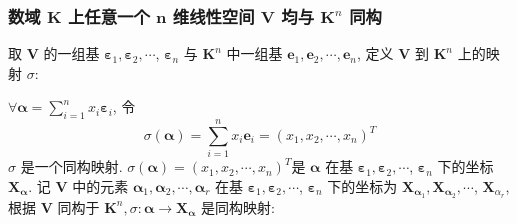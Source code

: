 \documentclass{article}
\begin{document}
			\subsubsection{数域 $\mathbf K$ 上任意一个 $\boldsymbol n$ 维线性空间 $\boldsymbol V$ 均与 $\mathbf K^{n}$ 同构}
				取 $\boldsymbol V$ 的一组基 $\boldsymbol \varepsilon_{1}, \boldsymbol \varepsilon_{2}, \cdots$, $\boldsymbol \varepsilon_{n}$ 与 $\mathbf K^{n}$ 中一组基 $\boldsymbol{e}_{1}, \boldsymbol{e}_{2}, \cdots, \boldsymbol{e}_{n}$, 定义 $\boldsymbol V$ 到 $\mathbf K^{n}$ 上的映射 $\sigma$:

				$\forall\boldsymbol\alpha=\sum_{i=1}^{n} x_{i} \boldsymbol \varepsilon_{i}$, 令
				$$
				\sigma(\boldsymbol{\alpha})=\sum_{i=1}^{n} x_{i} \boldsymbol{e}_{i}=\left(x_{1}, x_{2}, \cdots, x_{n}\right)^{T}
				$$
				$\sigma$ 是一个同构映射. $\sigma(\boldsymbol{\alpha})=\left(x_{1}, x_{2}, \cdots, x_{n}\right)^{T}$是 $\boldsymbol{\alpha}$ 在基 $\boldsymbol \varepsilon_{1}, \boldsymbol \varepsilon_{2}, \cdots$, $\boldsymbol \varepsilon_{n}$ 下的坐标 $\boldsymbol{X}_{\boldsymbol{\alpha}}$.
				记 $\boldsymbol V$ 中的元素 $\boldsymbol{\alpha}_{1}, \boldsymbol{\alpha}_{2}, \cdots, \boldsymbol{\alpha}_{r}$ 在基 $\boldsymbol \varepsilon_{1}, \boldsymbol \varepsilon_{2}, \cdots$, $\boldsymbol \varepsilon_{n}$ 下的坐标为 $\boldsymbol{X}_{\boldsymbol{\alpha}_{1}}, \boldsymbol{X}_{\boldsymbol{\alpha}_{2}}, \cdots$, $\boldsymbol{X}_{\alpha_{r}}$, 根据 $\boldsymbol V$ 同构于 $\mathbf K^{n}, \sigma: \boldsymbol{\alpha} \rightarrow \boldsymbol{X}_{\boldsymbol{\alpha}}$ 是同构映射:
\end{document}
